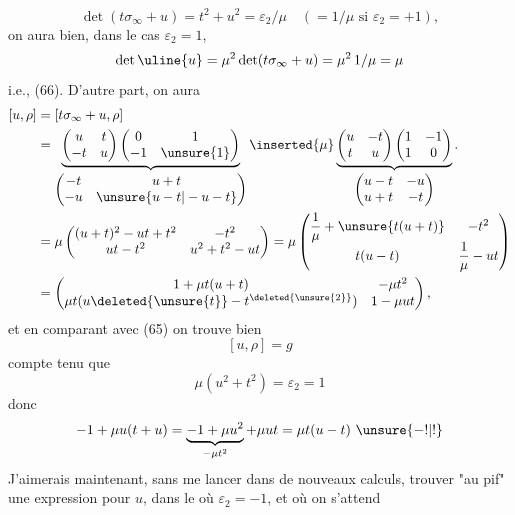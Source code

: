 \[
\det(t\sigma_\infty+u)=t^2+u^2=\varepsilon_2/\mu
\quad(=1/\mu\text{ si }\varepsilon_2=+1),
\]
on aura bien, dans le cas $\varepsilon_2=1$, 
\[
\det\uline{u}=\mu^2\det(t\sigma_\infty+u)=\mu^2\,1/\mu=\mu
\]
i.e., (66). D'autre part, on aura
\[
\begin{aligned}
[u,\rho]&=[t\sigma_\infty+u,\rho]\\
&=
\underbrace{
\begin{pmatrix}u&t\\-t&u\end{pmatrix}
\begin{pmatrix}0&1\\-1&\unsure{1}\end{pmatrix}
}_{\begin{pmatrix}-t&u+t\\-u&\unsure{u-t|-u-t}\end{pmatrix}}
\inserted{\mu}
\underbrace{
\begin{pmatrix}u&-t\\t&u\end{pmatrix}
\begin{pmatrix}1&-1\\1&0\end{pmatrix}
}_{\begin{pmatrix}u-t&-u\\u+t&-t\end{pmatrix}}.
\\
&=\mu\begin{pmatrix}
(u+t)^2-ut+t^2&-t^2\\
ut-t^2&u^2+t^2-ut
\end{pmatrix}
=\mu\begin{pmatrix}
\dfrac1\mu+\unsure{t(u+t)}&-t^2\\
t(u-t)&\dfrac1\mu-ut
\end{pmatrix}
\\
&=\begin{pmatrix}
1+\mu t(u+t)&-\mu t^2\\
\mu t(u\deleted{\unsure{t}}-t^{\deleted{\unsure{2}}})&1-\mu ut
\end{pmatrix},
\end{aligned}
\]
et en comparant avec (65) on trouve bien
\[
[u,\rho]=g
\]
compte tenu que
\[
\mu(u^2+t^2)=\varepsilon_2=1
\]
donc
\[
-1+\mu u(t+u)=\underbrace{-1+\mu u^2}_{-\mu t^2}+\mu ut
=\mu t(u-t)\ \unsure{-!|!}
\]
J'aimerais maintenant, sans me lancer dans de
nouveaux calculs, trouver "au pif" une expression
pour $u$, dans le  où $\varepsilon_2=-1$, et où on s'attend
